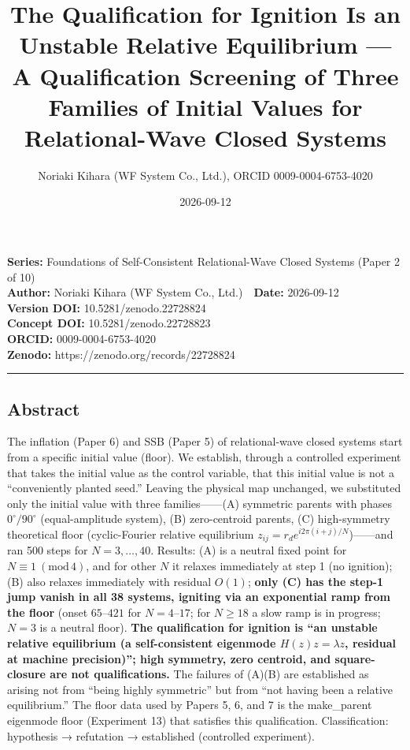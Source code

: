 \documentclass[
  a4paper,
]{ltjsarticle}
\title{The Qualification for Ignition Is an Unstable Relative
Equilibrium --- A Qualification Screening of Three Families of Initial
Values for Relational-Wave Closed Systems}
\author{Noriaki Kihara (WF System Co., Ltd.), ORCID 0009-0004-6753-4020}
\date{2026-09-12}
\begin{document}
\maketitle

\textbf{Series:} Foundations of Self-Consistent Relational-Wave Closed
Systems (Paper 2 of 10)\\
\textbf{Author:} Noriaki Kihara (WF System Co., Ltd.)　\textbf{Date:}
2026-09-12\\
\textbf{Version DOI:} 10.5281/zenodo.22728824\\
\textbf{Concept DOI:} 10.5281/zenodo.22728823\\
\textbf{ORCID:} 0009-0004-6753-4020\\
\textbf{Zenodo:} https://zenodo.org/records/22728824\\

\begin{center}\rule{0.5\linewidth}{0.5pt}\end{center}

\subsection{Abstract}\label{abstract}

The inflation (Paper 6) and SSB (Paper 5) of relational-wave closed
systems start from a specific initial value (floor). We establish,
through a controlled experiment that takes the initial value as the
control variable, that this initial value is not a ``conveniently
planted seed.'' Leaving the physical map unchanged, we substituted only
the initial value with three families------(A) symmetric parents with
phases \(0^\circ/90^\circ\) (equal-amplitude system), (B) zero-centroid
parents, (C) high-symmetry theoretical floor (cyclic-Fourier relative
equilibrium \(z_{ij}=r_d e^{i2\pi(i+j)/N}\))------and ran 500 steps for
\(N=3,\ldots,40\). Results: (A) is a neutral fixed point for
\(N\equiv1\ (\mathrm{mod}\,4)\), and for other \(N\) it relaxes
immediately at step 1 (no ignition); (B) also relaxes immediately with
residual \(O(1)\); \textbf{only (C) has the step-1 jump vanish in all 38
systems, igniting via an exponential ramp from the floor} (onset
\(65\)--\(421\) for \(N=4\)--\(17\); for \(N\ge18\) a slow ramp is in
progress; \(N=3\) is a neutral floor). \textbf{The qualification for
ignition is ``an unstable relative equilibrium (a self-consistent
eigenmode \(H(z)z=\lambda z\), residual at machine precision)''; high
symmetry, zero centroid, and square-closure are not qualifications.} The
failures of (A)(B) are established as arising not from ``being highly
symmetric'' but from ``not having been a relative equilibrium.'' The
floor data used by Papers 5, 6, and 7 is the make\_parent eigenmode
floor (Experiment 13) that satisfies this qualification. Classification:
hypothesis → refutation → established (controlled experiment).
\end{document}
